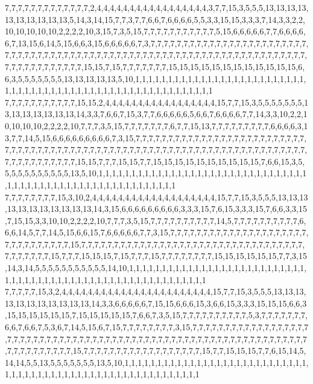 7,7,7,7,7,7,7,7,7,7,7,7,7,2,4,4,4,4,4,4,4,4,4,4,4,4,4,4,4,4,4,3,7,7,15,3,5,5,5,13,13,13,13,13,13,13,13,13,13,5,14,3,14,15,7,7,3,7,7,6,6,7,6,6,6,6,5,5,3,3,15,15,3,3,3,7,14,3,3,2,2,10,10,10,10,10,2,2,2,2,10,3,15,7,3,5,15,7,7,7,7,7,7,7,7,7,7,7,5,15,6,6,6,6,6,7,7,6,6,6,6,6,7,13,15,6,14,5,15,6,6,3,15,6,6,6,6,6,7,3,7,7,7,7,7,7,7,7,7,7,7,7,7,7,7,7,7,7,7,7,7,7,7,7,7,7,7,7,7,7,7,7,7,7,7,7,7,7,7,7,7,7,7,7,7,7,7,7,7,7,7,7,7,7,7,7,7,7,7,7,7,7,7,7,7,7,7,7,7,7,7,7,7,7,7,7,7,7,7,7,7,7,15,15,7,15,7,7,7,7,7,7,7,15,15,15,15,15,15,15,15,15,15,15,15,6,6,3,5,5,5,5,5,5,5,13,13,13,13,13,5,10,1,1,1,1,1,1,1,1,1,1,1,1,1,1,1,1,1,1,1,1,1,1,1,1,1,1,1,1,1,1,1,1,1,1,1,1,1,1,1,1,1,1,1,1,1,1,1,1,1,1,1,1,1,1,1,1,1,1
7,7,7,7,7,7,7,7,7,7,7,15,15,2,4,4,4,4,4,4,4,4,4,4,4,4,4,4,4,4,4,15,7,7,15,3,5,5,5,5,5,5,5,13,13,13,13,13,13,13,14,3,3,7,6,6,7,15,3,7,7,6,6,6,6,6,5,6,6,7,6,6,6,6,7,7,14,3,3,10,2,2,10,10,10,10,2,2,2,2,10,7,7,7,3,5,15,7,7,7,7,7,7,7,6,7,7,15,13,7,7,7,7,7,7,7,7,7,6,6,6,6,3,13,7,7,14,5,15,6,6,6,6,6,6,6,6,6,7,3,15,7,7,7,7,7,7,7,7,7,7,7,7,7,7,7,7,7,7,7,7,7,7,7,7,7,7,7,7,7,7,7,7,7,7,7,7,7,7,7,7,7,7,7,7,7,7,7,7,7,7,7,7,7,7,7,7,7,7,7,7,7,7,7,7,7,7,7,7,7,7,7,7,7,7,7,7,7,7,7,7,7,7,7,15,15,7,7,7,15,15,7,7,15,15,15,15,15,15,15,15,15,15,7,6,6,15,3,5,5,5,5,5,5,5,5,5,5,5,13,5,10,1,1,1,1,1,1,1,1,1,1,1,1,1,1,1,1,1,1,1,1,1,1,1,1,1,1,1,1,1,1,1,1,1,1,1,1,1,1,1,1,1,1,1,1,1,1,1,1,1,1,1,1,1,1,1,1,1,1
7,7,7,7,7,7,7,7,15,3,10,2,4,4,4,4,4,4,4,4,4,4,4,4,4,4,4,4,4,4,4,15,7,7,15,3,5,5,5,13,13,13,13,13,13,13,13,13,13,13,14,3,15,6,6,6,6,6,6,6,6,6,3,3,3,15,7,6,15,3,3,3,15,7,6,6,3,3,15,7,15,15,3,3,10,10,2,2,2,2,10,7,7,7,3,5,15,7,7,7,7,7,7,7,7,7,7,14,5,7,7,7,7,7,7,7,7,7,7,6,6,6,14,5,7,7,14,5,15,6,6,15,7,6,6,6,6,6,7,7,3,15,7,7,7,7,7,7,7,7,7,7,7,7,7,7,7,7,7,7,7,7,7,7,7,7,7,7,7,7,7,7,7,15,7,7,7,7,7,7,7,7,7,7,7,7,7,7,7,7,7,7,7,7,7,7,7,7,7,7,7,7,7,7,7,7,7,7,7,7,7,7,7,7,7,15,7,7,7,15,15,15,7,15,7,7,7,15,7,7,7,7,7,7,7,7,15,15,15,15,15,15,7,7,3,15,14,3,14,5,5,5,5,5,5,5,5,5,5,5,14,10,1,1,1,1,1,1,1,1,1,1,1,1,1,1,1,1,1,1,1,1,1,1,1,1,1,1,1,1,1,1,1,1,1,1,1,1,1,1,1,1,1,1,1,1,1,1,1,1,1,1,1,1,1,1,1,1,1,1
7,7,7,7,7,15,3,2,4,4,4,4,4,4,4,4,4,4,4,4,4,4,4,4,4,4,4,4,4,4,4,15,7,7,15,3,5,5,5,13,13,13,13,13,13,13,13,13,13,13,14,3,3,6,6,6,6,6,7,15,15,6,6,6,15,3,6,6,15,3,3,3,15,15,15,6,6,3,15,15,15,15,15,15,7,15,15,15,15,15,7,6,6,7,3,5,15,7,7,7,7,7,7,7,7,7,7,5,3,7,7,7,7,7,7,7,6,6,7,6,6,7,5,3,6,7,14,5,15,6,7,15,7,7,7,7,7,7,7,7,3,15,7,7,7,7,7,7,7,7,7,7,7,7,7,7,7,7,7,7,7,7,7,7,7,7,7,7,7,7,7,7,7,7,7,7,7,7,7,7,7,7,7,7,7,7,7,7,7,7,7,7,7,7,7,7,7,7,7,7,7,7,7,7,7,7,7,7,7,7,7,7,7,7,7,7,15,7,7,7,7,7,7,7,7,7,7,7,7,7,7,7,7,7,7,15,7,7,15,15,15,7,7,6,15,14,5,14,14,5,5,13,5,5,5,5,5,5,5,13,5,10,1,1,1,1,1,1,1,1,1,1,1,1,1,1,1,1,1,1,1,1,1,1,1,1,1,1,1,1,1,1,1,1,1,1,1,1,1,1,1,1,1,1,1,1,1,1,1,1,1,1,1,1,1,1,1,1,1,1
